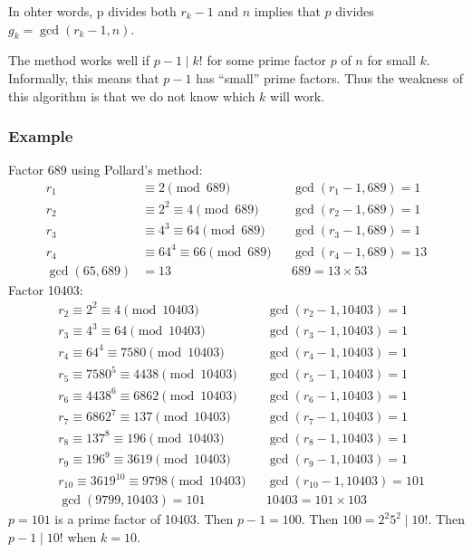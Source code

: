\documentclass[letterpaper,12pt,oneside]{article}
\begin{document}
In ohter words, p divides both $r_{k}-1$ and $n$ implies that $p$ divides $g_k = \gcd(r_{k}-1,n)$. 

The method works well if $p-1 \mid k!$ for some prime factor $p$ of $n$ for small $k$. Informally, this means that $p-1$ has ``small'' prime factors. Thus the weakness of this algorithm is that we do not know which $k$ will work.

\subsubsection{Example}
Factor 689 using Pollard's method:\begin{align*}
    r_1 & \equiv 2 \pmod {689} && \gcd(r_1-1, 689)=1 \\
    r_2 & \equiv 2^2 \equiv 4 \pmod {689} && \gcd(r_2-1, 689)=1 \\
    r_3 & \equiv 4^3 \equiv 64 \pmod {689} && \gcd(r_3-1, 689)=1 \\
    r_4 & \equiv 64^4 \equiv 66 \pmod {689} && \gcd(r_4-1, 689)=13 \\
    \gcd(65,689) & = 13 && 689=13\times 53
\end{align*}
Factor 10403: \begin{align*}
    &r_2\equiv 2^2\equiv 4 \pmod {10403} && \gcd(r_2-1,10403)=1 \\
    &r_3\equiv 4^3\equiv 64 \pmod {10403} && \gcd(r_3-1,10403)=1 \\
    &r_4\equiv 64^4\equiv 7580 \pmod {10403} && \gcd(r_4-1,10403)=1 \\ 
    &r_5\equiv 7580^5\equiv 4438 \pmod {10403} && \gcd(r_5-1,10403)=1 \\
    &r_6\equiv 4438^6\equiv 6862 \pmod {10403} && \gcd(r_6-1,10403)=1 \\
    &r_7\equiv 6862^7\equiv 137 \pmod {10403} && \gcd(r_7-1,10403)=1 \\
    &r_8\equiv 137^8\equiv 196 \pmod {10403} && \gcd(r_8-1,10403)=1 \\
    &r_9\equiv 196^9\equiv 3619 \pmod {10403} && \gcd(r_9-1,10403)=1 \\
    &r_{10}\equiv 3619^{10}\equiv 9798 \pmod {10403} && \gcd(r_{10}-1,10403)=101 \\
    &\gcd(9799,10403)  = 101 && 10403=101\times 103
\end{align*}
$p=101$ is a prime factor of 10403. Then $p-1=100$. Then $100=2^2 5^2\mid 10!$. Then $p-1\mid 10!$ when $k=10$.
\end{document}
